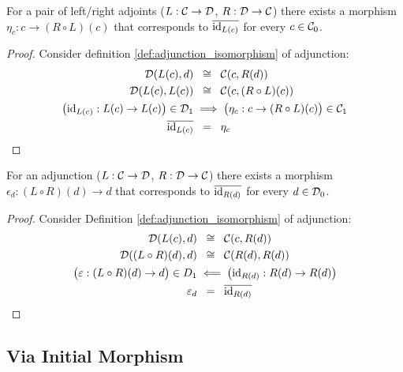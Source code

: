 \begin{theorem}
  For a pair of left/right adjoints ($L: \mathcal{C} \to \mathcal{D}$, $R:\mathcal{D}\to \mathcal{C}$)
  there exists a morphism $\eta_c: c\to (R\circ L)(c)$ that corresponds to
  $\overline{\mathrm{id}_{L(c)}}$ for every $c\in \mathcal{C}_0$.

  \begin{proof}
    Consider definition \ref{def:adjunction_isomorphism} of adjunction:
    \[
      \begin{aligned}
        \mathcal{D}(L(c), d) &\ \:\cong\ \: \mathcal{C}(c, R(d))\\
        \mathcal{D}(L(c), L(c)) &\ \:\cong\ \: \mathcal{C}(c, (R\circ L)(c))\\
        \big(\mathrm{id}_{L(c)}: L(c) \to L(c)\big) \in \mathcal{D}_1
        &\implies \big(\eta_c : c \to (R\circ L)(c)\big)\in \mathcal{C}_1\\
        \overline{\mathrm{id}_{L(c)}} &\ \:=\ \:\eta_c
      \end{aligned}
    \]
  \end{proof}
\end{theorem}

\begin{theorem}
  For an adjunction ($L: \mathcal{C} \to \mathcal{D}$, $R:\mathcal{D}\to \mathcal{C}$)
  there exists a morphism $\epsilon_d: (L\circ R)(d)\to d$ that corresponds to
  $\overline{\mathrm{id}_{R(d)}}$ for every $d\in \mathcal{D}_0$.

  \begin{proof}
    Consider Definition \ref{def:adjunction_isomorphism} of adjunction:
    \[
      \begin{aligned}
        \mathcal{D}(L(c), d) &\ \:\cong\ \: \mathcal{C}(c, R(d))\\
        \mathcal{D}((L\circ R)(d), d) &\ \:\cong\ \: \mathcal{C}(R(d), R(d))\\
        \big(\varepsilon:(L\circ R)(d)\to d\big)\in D_1 &\impliedby
          \big(\mathrm{id}_{R(d)}: R(d) \to R(d)\big)\\
        \varepsilon_d &\ \:=\ \:\overline{\mathrm{id}_{R(d)}}
      \end{aligned}
    \]
  \end{proof}
\end{theorem}

\subsection{Via Initial Morphism}


